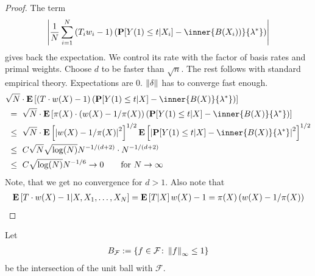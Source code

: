 \begin{proof}
The term 
\begin{gather}
    \left|  
  \frac{1}{N}
    \sum_{i=1}^{N} 
    \left( 
    T_i
    w_i
    -
    1
    \right)
    \left( 
    \P[Y(1)\le t | X_i]
    -
    \inner
    {B(X_i))}
    {\lambda^*}
    \right)
  \right|
\end{gather}
gives back the expectation. We control its rate 
with the factor of basis rates and primal weights.
Choose $d$ to be faster than $\sqrt{n}$.
The rest follows with standard empirical theory.
Expectations are 0.
$\left\lVert\delta\right\rVert$ has to converge fast enough.
\begin{align*}
  &
  \sqrt{N}
  \cdot
  \E
  \left[ 
    \left( 
    T
    \cdot
    w(X)
    -
    1
    \right)
    \left( 
      \P
      [
      Y(1)\le t
      |X
      ]
      -
      \inner
      {B(X)}
      {\lambda^*}
    \right)
  \right]
  \\
  &
  \ 
  =
  \ 
  \sqrt{N}
  \cdot
  \E
  \left[ 
    \pi(X)
    \cdot
    \left( 
    w(X)
    -
    1
    /
    \pi(X)
    \right)
    \left( 
      \P
      [
      Y(1)\le t
      |X
      ]
      -
      \inner
      {B(X)}
      {\lambda^*}
    \right)
  \right]
  \\
  &
  \ 
  \le
  \ 
  \sqrt{N}
  \cdot
  \E
  \left[ 
    \left| 
    w(X)
    -
    1
    /
    \pi(X)
    \right|
    ^2
    \right]
    ^{1/2}
  \E
  \left[ 
    \left| 
      \P
      [
      Y(1)\le t
      |X
      ]
      -
      \inner
      {B(X)}
      {\lambda^*}
    \right|
    ^2
    \right]
    ^{1/2}
    \\
  &
  \ 
  \le
  \ 
  C
  \sqrt{N}
  \sqrt{\log(N)}
  N^{-1/(d+2)}
  \cdot
  N^{-1/(d+2)}
    \\
  &
  \ 
  \le
  \ 
  C
  \sqrt{\log(N)}
  N^{-1/6}
  \to 0
  \qquad
  \text{for}\ 
  N\to\infty
\end{align*}
Note, that we get no convergence for $d>1$. 
Also note that
\begin{gather*}
  \mathbf{E}
  \left[ 
    T
    \cdot
    w(X)
    -
    1
    |
    X,
    X_1,
    \ldots,
    X_N
    \right]
    =
  \mathbf{E}
  \left[ 
    T
    |
    X
    \right]
    w(X)
    -
    1
    =
    \pi(X)
    \left( 
      w(X)
      -
      1/\pi(X)
    \right)
\end{gather*}
\end{proof}
Let 
\begin{gather}
  B_{\mathcal{F}}
  :=
  \left\{ 
    f\in \mathcal{F}
    \colon
    \left\lVert f\right\rVert_\infty
    \le
    1
  \right\}
\end{gather}
be the intersection of the unit ball with $\mathcal{F}$.
